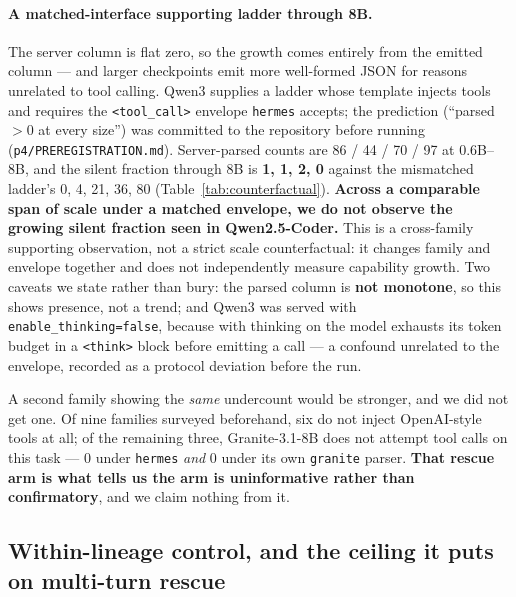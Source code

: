 \paragraph{A matched-interface supporting ladder through 8B.} The server column is flat zero, so the growth comes entirely from
the emitted column --- and larger checkpoints emit more well-formed JSON for reasons unrelated to
tool calling. Qwen3 supplies a ladder whose template injects tools and requires the
\texttt{<tool\_call>} envelope \texttt{hermes} accepts; the prediction (``parsed $>0$ at every
size'') was committed to the repository before running (\texttt{p4/PREREGISTRATION.md}).
Server-parsed counts are 86 / 44 / 70 / 97 at 0.6B--8B, and the silent fraction through 8B is
\textbf{1, 1, 2, 0} against the mismatched ladder's 0, 4, 21, 36, 80
(Table~\ref{tab:counterfactual}). \textbf{Across a comparable span of scale under a matched
envelope, we do not observe the growing silent fraction seen in Qwen2.5-Coder.} This is a
cross-family supporting observation, not a strict scale counterfactual: it changes family and
envelope together and does not independently measure capability growth. Two caveats we state rather than bury: the parsed column is \textbf{not
monotone}, so this shows presence, not a trend; and Qwen3 was served with
\texttt{enable\_thinking=false}, because with thinking on the model exhausts its token budget in a
\texttt{<think>} block before emitting a call --- a confound unrelated to the envelope, recorded
as a protocol deviation before the run.

A second family showing the \emph{same} undercount would be stronger, and we did not get one. Of
nine families surveyed beforehand, six do not inject OpenAI-style tools at all; of the remaining
three, Granite-3.1-8B does not attempt tool calls on this task --- 0 under \texttt{hermes}
\emph{and} 0 under its own \texttt{granite} parser. \textbf{That rescue arm is what tells us the
arm is uninformative rather than confirmatory}, and we claim nothing from it.

\subsection{Within-lineage control, and the ceiling it puts on multi-turn rescue}
\label{sec:instruct}

